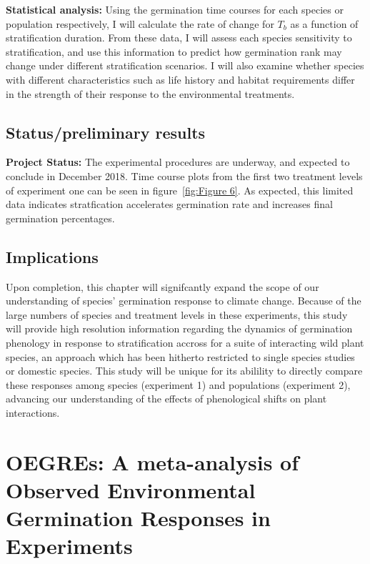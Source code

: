 \documentclass{article}\usepackage[]{graphicx}\usepackage[]{color}
\begin{document}
\indent\textbf{Statistical analysis:} Using the germination time courses for each species or population respectively, I will calculate the rate of change for $T_b$ as a function of stratification duration. From these data, I will assess each species sensitivity to stratification, and use this information to predict how germination rank may change under different stratification scenarios. I will also examine whether species with different characteristics such as life history and habitat requirements differ in the strength of their response to the environmental treatments.\\
\subsection*{Status/preliminary results}
\textbf{Project Status:} The experimental procedures are underway, and expected to conclude in December 2018. Time course plots from the first two treatment levels of experiment one can be seen in figure~\ref{fig:Figure 6}. As expected, this limited data indicates stratfication accelerates germination rate and increases final germination percentages.\\
\subsection*{Implications}
\indent\indent Upon completion, this chapter will signifcantly expand the scope of our understanding of species' germination response to climate change. Because of the large numbers of species and treatment levels in these experiments, this study will provide high resolution information regarding the dynamics of germination phenology in response to stratification accross for a suite of interacting wild plant species, an approach which has been hitherto restricted to single species studies or domestic species. This study will be unique for its abilility to directly compare these responses among species (experiment 1) and populations (experiment 2), advancing our understanding of the effects of phenological shifts on plant interactions.
\section*{OEGREs: A meta-analysis of Observed Environmental Germination Responses in Experiments}
\end{document}
